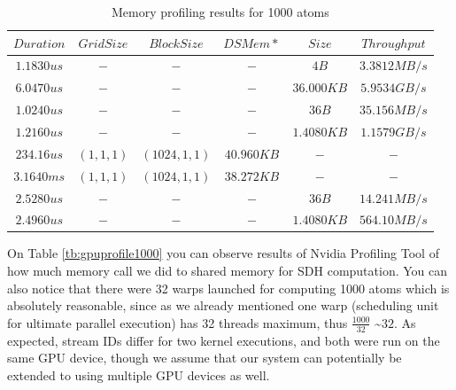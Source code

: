 \documentclass[12pt,letterpaper]{report}
\begin{document}
\begin{table}[h!]
	\renewcommand*{\arraystretch}{1.5}
	\tabcolsep=0.12cm
  \centering
  \begin{tabular}{| c | c | c | c | c | c |}
   \hline

$Duration$ & $Grid Size$ & $Block Size$ & $DSMem*$ & $Size$ & $Throughput$ \\ \hline 
$1.1830us$ & $-$ & $-$ & $-$ & $4B$ & $3.3812MB/s$ \\ \hline 
$6.0470us$ & $-$ & $-$ & $-$ & $36.000KB$ & $5.9534GB/s$ \\ \hline 
$1.0240us$ & $-$ & $-$ & $-$ & $36B$ & $35.156MB/s$ \\ \hline 
$1.2160us$ & $-$ & $-$ & $-$ & $1.4080KB$ & $1.1579GB/s$ \\ \hline 
$234.16us$ & $(1,1,1)$ & $(1024,1,1)$ & $40.960KB$ & $-$ & $-$ \\ \hline 
$3.1640ms$ & $(1,1,1)$ & $(1024,1,1)$ & $38.272KB$ & $-$ & $-$ \\ \hline 
$2.5280us$ & $-$ & $-$ & $-$ & $36B$ & $14.241MB/s$ \\ \hline 
$2.4960us$ & $-$ & $-$ & $-$ & $1.4080KB$ & $564.10MB/s$ \\
	\hline

  \end{tabular}
    \caption{Memory profiling results for 1000 atoms}
    	  \label{tb:gpumem1000}
\end{table}

\noindent\hspace{3em}On Table \ref{tb:gpuprofile1000} you can observe results of Nvidia Profiling Tool of how much memory call we did to shared memory for SDH computation. You can also notice that there were 32 warps launched for computing 1000 atoms which is absolutely reasonable, since as we already mentioned one warp (scheduling unit for ultimate parallel execution) has 32 threads maximum, thus ${\frac{1000}{32}}$ \textasciitilde \space$32$. As expected, stream IDs differ for two kernel executions, and both were run on the same GPU device, though we assume that our system can potentially be extended to using multiple GPU devices as well.
\end{document}
